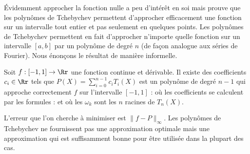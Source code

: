 \documentclass[11pt,class=report,crop=false]{standalone}
\begin{document}
Évidemment approcher la fonction nulle a peu d'intérêt en soi mais prouve que les polynômes de Tchebychev permettent 
d'approcher efficacement une fonction sur un intervalle tout entier et pas seulement en quelques points.
Les polynômes de Tchebychev permettent en fait d'approcher n'importe quelle fonction 
sur un intervalle $[a,b]$ par un polynôme de degré $n$ (de façon analogue aux séries de Fourier).
Nous énonçons le résultat de manière informelle. 

Soit $f : [-1,1] \to \Rr$ une fonction continue et dérivable.
Il existe des coefficients $c_i \in \Rr$ tels que $P(X) = \sum_{i=0}^{n-1} c_i T_i(X)$ est un polynôme de degré $n-1$ 
qui approche correctement $f$ sur l'intervalle $[-1,1]$ :
où les coefficients se calculent par les formules :
et où les $\omega_k$ sont les $n$ racines de $T_n(X)$.

L'erreur que l'on cherche à minimiser est $\| f - P \|_{\infty}$. Les polynômes de Tchebychev ne fournissent pas une approximation optimale mais
une approximation qui est suffisamment bonne pour être utilisée dans la plupart des cas.
\end{document}
